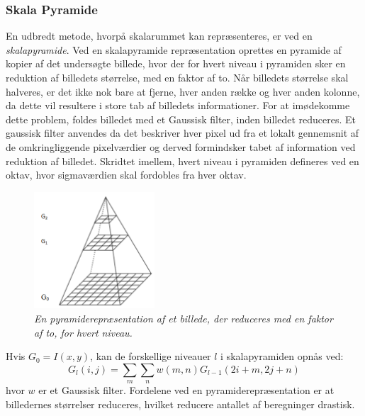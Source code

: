 \subsubsection*{Skala Pyramide}
En udbredt metode, hvorpå skalarummet kan repræsenteres, er ved en \textit{skalapyramide}. Ved en skalapyramide repræsentation oprettes en pyramide af kopier af det undersøgte billede, hvor der for hvert niveau i pyramiden sker en reduktion af billedets størrelse, med en faktor af to. 
Når billedets størrelse skal halveres, er det ikke nok bare at fjerne, hver anden række og hver anden kolonne, da dette vil resultere i store tab af billedets informationer. For at imødekomme dette problem, foldes billedet med et Gaussisk filter, inden billedet reduceres. Et gaussisk filter anvendes da det beskriver hver pixel ud fra et lokalt gennemsnit af de omkringliggende pixelværdier og derved formindsker tabet af information ved reduktion af billedet. Skridtet imellem, hvert niveau i pyramiden defineres ved en oktav, hvor sigmaværdien skal fordobles fra hver oktav.
 \begin{figure}[H]
    \centering
    \includegraphics[width=0.40\textwidth]{fig/40.png}
     \vspace{-1em}
    \begin{center}    
       \caption{{\footnotesize \textit{En pyramiderepræsentation af et billede, der reduceres med en faktor af to, for hvert niveau. }}}
    \label{fig:scalerepdiff}
     \end{center}
     \vspace{-2.5em}
  \end{figure} \noindent
Hvis $G_0=I(x,y)$, kan de forskellige niveauer $l$ i skalapyramiden opnås ved:
\begin{equation}
G_l(i,j)=\sum\limits_{m}\sum\limits_{n}w(m,n)G_{l-1}(2i+m,2j+n)
\end{equation}
hvor $w$ er et Gaussisk filter. Fordelene ved en pyramiderepræsentation er at billedernes størrelser reduceres, hvilket reducere antallet af beregninger drastisk.
